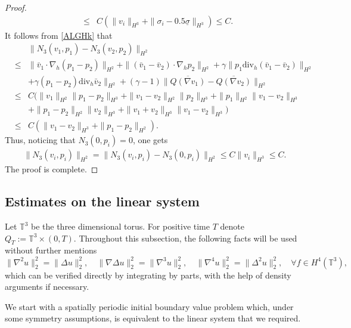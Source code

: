 \documentclass[12pt,reqno]{amsart}
\numberwithin{equation}{section}
\begin{document}
\begin{proof}
\begin{eqnarray*}
  &\leq& C(\|v_i\|_{H^3}+\|\sigma_i-0.5\underline\sigma
  \|_{H^3})\leq C.
\end{eqnarray*}
It follows from \eqref{ALGHk} that
\begin{eqnarray*}
  &&\|N_3(v_1,p_1)-N_3(v_2,p_2)\|_{H^2}\nonumber\\
  &\leq&\|\bar v_1\cdot\nabla_h(p_1-p_2)\|_{H^2}+\|(\bar v_1-\bar v_2)\cdot\nabla_hp_2\|_{H^2}+\gamma\|p_1\text{div}_h(\bar v_1-\bar v_2)\|_{H^2}\\
  &&+\gamma(p_1-p_2)\text{div}_h\bar v_2\|_{H^2}+(\gamma-1)\|\overline{Q(\nabla v_1)}-\overline{Q(\nabla v_2)}\|_{H^2}\\
  &\leq&C(\|v_1\|_{H^2}\|p_1-p_2\|_{H^3}+\|v_1-v_2\|_{H^2}\|p_2\|_{H^3}+ \|p_1\|_{H^2}\| v_1-v_2\|_{H^3}\\
  &&+\|p_1-p_2\|_{H^2}\| v_2\|_{H^3}+\|v_1+v_2\|_{H^3}\|v_1-v_2\|_{H^3})\\
  &\leq&C(\|v_1-v_2\|_{H^3}+\|p_1-p_2\|_{H^2}).
\end{eqnarray*}
Thus, noticing that $N_3(0,p_i)=0$, one gets
\begin{eqnarray*}
  \|N_3(v_i,p_i)\|_{H^2}= \|N_3(v_i,p_i)-N_3(0,p_i)\|_{H^2}\leq C\|v_i\|_{H^3}\leq C.
\end{eqnarray*}
The proof is complete.
\end{proof}

\subsection{Estimates on the linear system}
Let $\mathbb T^3$ be the three dimensional torus. For positive time $T$ denote $Q_T:=\mathbb T^3\times(0,T)$.
Throughout this subsection, the following facts will be used without further mentions
$$
  \|\nabla^2u\|_2^2=\|\Delta u\|_2^2,\quad\|\nabla\Delta u\|_2^2=\|\nabla^3 u\|_2^2,\quad \|\nabla^4u\|_2^2=\|\Delta^2 u\|_2^2,\quad\forall f\in H^4(\mathbb T^3),
$$
which can be verified directly by integrating by parts, with the help of density arguments if necessary.

We start with a spatially periodic initial boundary value problem which, under some symmetry assumptions, is equivalent to the
linear system that we required.
\end{document}
